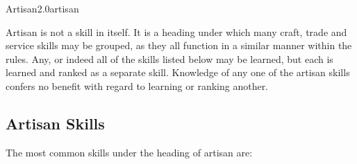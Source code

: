 \begin{skill}{Artisan}{2.0}{artisan}

Artisan is not a skill in itself. It is a heading under which many
craft, trade and service skills may be grouped, as they all function
in a similar manner within the rules. Any, or indeed all of the skills
listed below may be learned, but each is learned and ranked as a
separate skill. Knowledge of any one of the artisan skills confers no
benefit with regard to learning or ranking another.

\subsection{Artisan Skills}

The most common skills under the heading of artisan are:


\end{skill}
